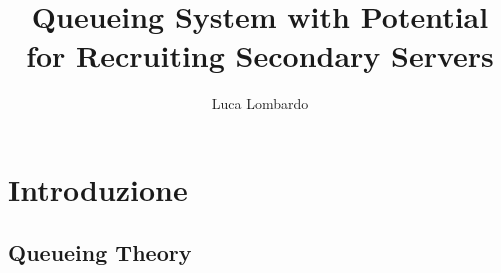 \documentclass[11pt]{article}
\title{Queueing System with Potential for Recruiting Secondary Servers}
\author{Luca Lombardo}
\date{}
\newcommand{\N}{\mathbb{N}}
\begin{document}
\maketitle
\tableofcontents

\section{Introduzione}



\subsection{Queueing Theory}




\end{document}
